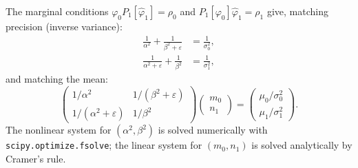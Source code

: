 \documentclass[11pt,a4paper]{article}
\newcommand{\eps}{\varepsilon}
\newcommand{\Pt}[1]{P_{#1}}   %
\begin{document}
The marginal conditions $\varphi_0\Pt{1}[\hat\varphi_1] = \rho_0$ and
$\Pt{1}[\varphi_0]\hat\varphi_1 = \rho_1$ give, matching precision
(inverse variance):
\begin{align}
  \frac{1}{\alpha^2} + \frac{1}{\beta^2+\eps} &= \frac{1}{\sigma_0^2},\\
  \frac{1}{\alpha^2+\eps} + \frac{1}{\beta^2} &= \frac{1}{\sigma_1^2},
\end{align}
and matching the mean:
\begin{equation}
  \begin{pmatrix} 1/\alpha^2 & 1/(\beta^2+\eps) \\[3pt]
    1/(\alpha^2+\eps) & 1/\beta^2 \end{pmatrix}
  \begin{pmatrix} m_0 \\ n_1 \end{pmatrix}
  = \begin{pmatrix} \mu_0/\sigma_0^2 \\ \mu_1/\sigma_1^2 \end{pmatrix}.
\end{equation}
The nonlinear system for $(\alpha^2,\beta^2)$ is solved numerically
with \texttt{scipy.optimize.fsolve}; the linear system for $(m_0,n_1)$
is solved analytically by Cramer's rule.
\end{document}
